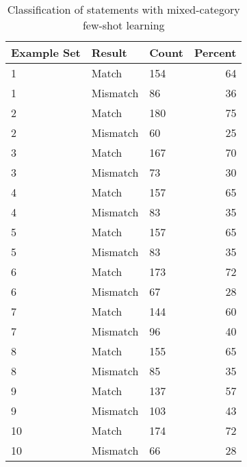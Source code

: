 \documentclass{bmcart}
\begin{document}
\begin{backmatter}
\begin{table}
\caption{\label{tab:fewshotmixed}Classification of statements with mixed-category few-shot learning}
\centering
\begin{tabular}[t]{lllr}
Example Set & Result & Count & Percent\\
\hline
1 & Match & 154 & 64\\
1 & Mismatch & 86 & 36\\
2 & Match & 180 & 75\\
2 & Mismatch & 60 & 25\\
3 & Match & 167 & 70\\
3 & Mismatch & 73 & 30\\
4 & Match & 157 & 65\\
4 & Mismatch & 83 & 35\\
5 & Match & 157 & 65\\
5 & Mismatch & 83 & 35\\
6 & Match & 173 & 72\\
6 & Mismatch & 67 & 28\\
7 & Match & 144 & 60\\
7 & Mismatch & 96 & 40\\
8 & Match & 155 & 65\\
8 & Mismatch & 85 & 35\\
9 & Match & 137 & 57\\
9 & Mismatch & 103 & 43\\
10 & Match & 174 & 72\\
10 & Mismatch & 66 & 28\\
\hline
\end{tabular}
\end{table}




\begin{table}


\end{table}
\end{backmatter}
\end{document}
